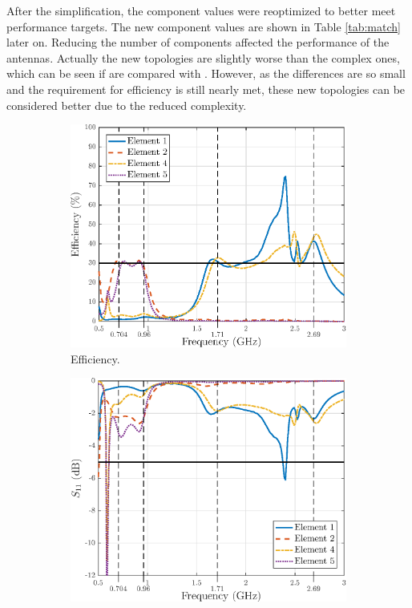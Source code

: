After the simplification, the component values were reoptimized to better meet performance targets. The new component values are shown in Table \ref{tab:match} later on. Reducing the number of components affected the performance of the antennas. Actually the new topologies are slightly worse than the complex ones, which can be seen if  are compared with . However, as the differences are so small and the requirement for efficiency is still nearly met, these new topologies can be considered better due to the reduced complexity.
\begin{figure}[H]
    \centering
    \begin{subfigure}[b]{0.49\textwidth}
        \includegraphics[width=\textwidth]{img/diversity_eff_ideal.eps}
        \caption{Efficiency.}
        \label{fig:div_eff_ideal}
    \end{subfigure}
    \begin{subfigure}[b]{0.49\textwidth}
        \includegraphics[width=\textwidth]{img/diversity_final_match.eps}

\end{subfigure}
\end{figure}
